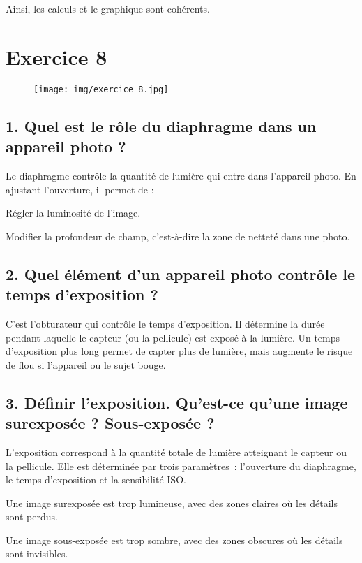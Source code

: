 \documentclass[answers]{exam}
\begin{document}
\noindent Ainsi, les calculs et le graphique sont cohérents.

\section*{Exercice 8}

\begin{figure}[H]
  \centering
  \texttt{[image: img/exercice\_8.jpg]}
\end{figure}

\subsection*{1. Quel est le rôle du diaphragme dans un appareil photo ?}

Le diaphragme contrôle la quantité de lumière qui entre dans l’appareil photo. En ajustant l'ouverture, il permet de :
\begin{compactenum}
    \item Régler la luminosité de l’image.
    \item Modifier la profondeur de champ, c'est-à-dire la zone de netteté dans une photo.
\end{compactenum}

\subsection*{2. Quel élément d’un appareil photo contrôle le temps d’exposition ?}

C’est l’obturateur qui contrôle le temps d’exposition. Il détermine la durée pendant laquelle le capteur (ou la pellicule) est exposé à la lumière. Un temps d’exposition plus long permet de capter plus de lumière, mais augmente le risque de flou si l’appareil ou le sujet bouge.

\subsection*{3. Définir l’exposition. Qu’est-ce qu’une image surexposée ? Sous-exposée ?}

L’exposition correspond à la quantité totale de lumière atteignant le capteur ou la pellicule. Elle est déterminée par trois paramètres : l’ouverture du diaphragme, le temps d’exposition et la sensibilité ISO.

\begin{compactenum}
    \item Une image surexposée est trop lumineuse, avec des zones claires où les détails sont perdus.
    \item Une image sous-exposée est trop sombre, avec des zones obscures où les détails sont invisibles.
\end{compactenum}
\end{document}
